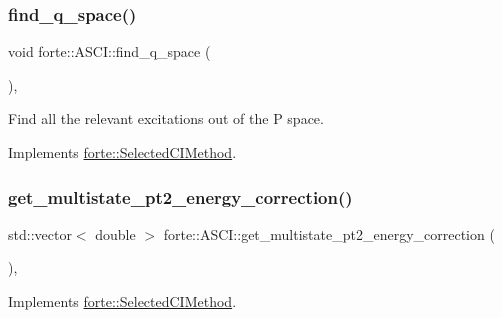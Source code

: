 \subsubsection{\texorpdfstring{find\+\_\+q\+\_\+space()}{find\_q\_space()}}
{\footnotesize\ttfamily void forte\+::\+A\+S\+C\+I\+::find\+\_\+q\+\_\+space (\begin{DoxyParamCaption}{ }\end{DoxyParamCaption})\hspace{0.3cm}{\ttfamily [override]}, {\ttfamily [virtual]}}



Find all the relevant excitations out of the P space. 



Implements \mbox{\hyperlink{classforte_1_1_selected_c_i_method_aff521efa08edfafb479f32e03a70c118}{forte\+::\+Selected\+C\+I\+Method}}.

\mbox{\label{classforte_1_1_a_s_c_i_ac497073adeab7700979678c15dcb475e}} 
\subsubsection{\texorpdfstring{get\+\_\+multistate\+\_\+pt2\+\_\+energy\+\_\+correction()}{get\_multistate\_pt2\_energy\_correction()}}
{\footnotesize\ttfamily std\+::vector$<$ double $>$ forte\+::\+A\+S\+C\+I\+::get\+\_\+multistate\+\_\+pt2\+\_\+energy\+\_\+correction (\begin{DoxyParamCaption}{ }\end{DoxyParamCaption})\hspace{0.3cm}{\ttfamily [override]}, {\ttfamily [virtual]}}



Implements \mbox{\hyperlink{classforte_1_1_selected_c_i_method_abbe18ea3e5f1a77df13a38764aeef62c}{forte\+::\+Selected\+C\+I\+Method}}.

\mbox{\label{classforte_1_1_a_s_c_i_a13310cf1f39f174d298194efea95572f}} 
